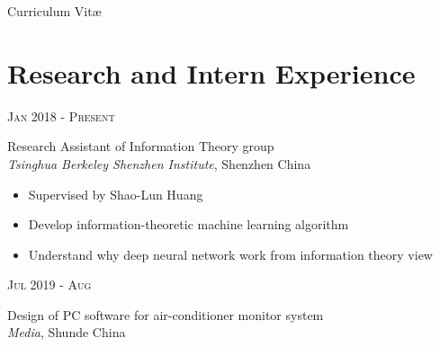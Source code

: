 \documentclass[10pt]{article} %
\begin{document}
\color{text1} %


\par{%
{\color{headings}\zapfino Curriculum {Vit\zapfino \ae}\\[15pt]\par} %


\begin{minipage}[t]{0.5\textwidth} %
\vspace{0pt} %


\section{Research and Intern Experience}

{\raggedleft\textsc{Jan 2018 - Present}\par}

{\raggedright\large Research Assistant of Information Theory group\\
\textit{Tsinghua Berkeley Shenzhen Institute}, Shenzhen China\\[5pt]}

\normalsize{\begin{itemize}
		\item Supervised by Shao-Lun Huang
		\item Develop information-theoretic machine learning algorithm
		\item Understand why deep neural network work from information theory view
\end{itemize}}

{\raggedleft\textsc{Jul 2019 - Aug}\par}

{\raggedright\large Design of PC software for air-conditioner monitor system\\
\textit{Media}, Shunde China\\[5pt]}


\end{minipage}}
\end{document}
